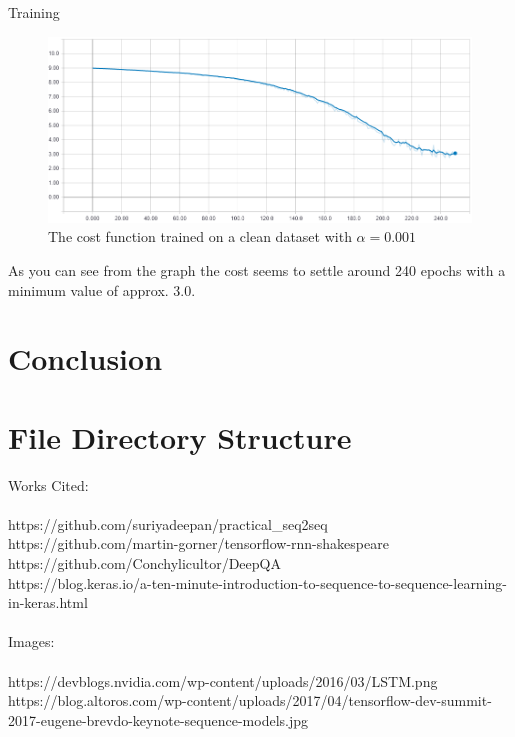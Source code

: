 \documentclass[titlepage]{article}
\begin{document}
Training
\begin{figure}[H]
	\centering
	\includegraphics[width=120mm]{cost-clean-001.png}
	\caption{The cost function trained on a clean dataset with $\alpha = 0.001$}
	\label{fig:cc001}
\end{figure}
As you can see from the graph the cost seems to settle around 240 epochs with a minimum value of approx. 3.0.

\section{Conclusion}

\section{File Directory Structure}

\newpage
\large{Works Cited:}\\
\small{
\\https://github.com/suriyadeepan/practical\_seq2seq
\\https://github.com/martin-gorner/tensorflow-rnn-shakespeare 
\\https://github.com/Conchylicultor/DeepQA
\\https://blog.keras.io/a-ten-minute-introduction-to-sequence-to-sequence-learning-in-keras.html
}
~\\~\\
\large{Images:}\\
\small{
\\https://devblogs.nvidia.com/wp-content/uploads/2016/03/LSTM.png
\\https://blog.altoros.com/wp-content/uploads/2017/04/tensorflow-dev-summit-2017-eugene-brevdo-keynote-sequence-models.jpg
}\\
\nocite{*}


\end{document}
